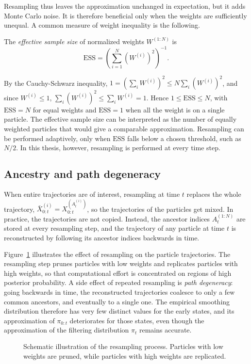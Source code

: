 Resampling thus leaves the approximation unchanged in expectation, but it adds Monte Carlo noise. It is therefore beneficial only when the weights are sufficiently unequal. A common measure of weight inequality is the following.

\begin{definition}
    \label{def:ess}
    The \emph{effective sample size} of normalized weights $W^{(1:N)}$ is
    \begin{equation}
        \mathrm{ESS} = \left(\sum_{i=1}^{N}\left(W^{(i)}\right)^2\right)^{-1}.
    \end{equation}
\end{definition}
By the Cauchy-Schwarz inequality, $1 = \left(\sum_iW^{(i)}\right)^2\le N\sum_i(W^{(i)})^2$, and since $W^{(i)}\le1$, $\sum_i(W^{(i)})^2\le\sum_iW^{(i)} = 1$. Hence $1\le\mathrm{ESS}\le N$, with $\mathrm{ESS} = N$ for equal weights and $\mathrm{ESS} = 1$ when all the weight is on a single particle. The effective sample size can be interpreted as the number of equally weighted particles that would give a comparable approximation. Resampling can be performed adaptively, only when $\mathrm{ESS}$ falls below a chosen threshold, such as $N/2$. In this thesis, however, resampling is performed at every time step.

\subsection{Ancestry and path degeneracy}
When entire trajectories are of interest, resampling at time $t$ replaces the whole trajectory, $\bar{X}_{0:t}^{(i)} = X_{0:t}^{(A_t^{(i)})}$, so the trajectories of the particles get mixed. In practice, the trajectories are not copied. Instead, the ancestor indices $A_t^{(1:N)}$ are stored at every resampling step, and the trajectory of any particle at time $t$ is reconstructed by following its ancestor indices backwards in time.

Figure~\ref{fig:resampling} illustrates the effect of resampling on the particle trajectories. The resampling step prunes particles with low weights and replicates particles with high weights, so that computational effort is concentrated on regions of high posterior probability. A side effect of repeated resampling is \emph{path degeneracy}: going backwards in time, the reconstructed trajectories coalesce to only a few common ancestors, and eventually to a single one. The empirical smoothing distribution therefore has very few distinct values for the early states, and its approximation of $\pi_{0:t}$ deteriorates for those states, even though the approximation of the filtering distribution $\pi_t$ remains accurate.
\begin{figure}
    \centering
    \resizebox{0.8\textwidth}{!}{
        
    }
    \caption{Schematic illustration of the resampling process. Particles with low weights are pruned, while particles with high weights are replicated.}
    \label{fig:resampling}
\end{figure}

